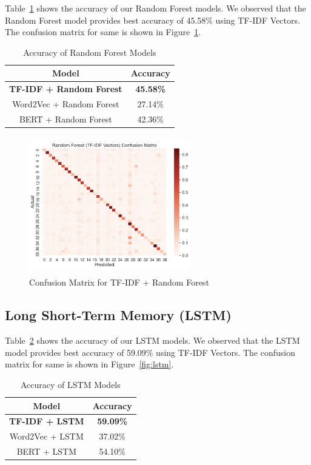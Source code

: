\documentclass[conference]{IEEEtran}
\begin{document}
Table~\ref{tab: rf_models} shows the accuracy of our Random Forest models. We observed that the Random Forest model provides best accuracy of 45.58\% using TF-IDF Vectors. The confusion matrix for same is shown in Figure~\ref{fig:rf}.

\begin{table}[!htb]
\centering
\caption{Accuracy of Random Forest Models}
\label{tab: rf_models}
\begin{tabular}{c|c}\midrule\midrule
Model & Accuracy\\ \midrule
\textbf{TF-IDF + Random Forest} & \textbf{45.58\%} \\
Word2Vec + Random Forest & 27.14\% \\
BERT + Random Forest & 42.36\% \\ \midrule\midrule
\end{tabular}
\end{table}

\begin{figure}[!htb]
\centering
\includegraphics[width=70mm, height = 60mm]{Images/Random Forest.png}
\caption{Confusion Matrix for TF-IDF + Random Forest}\label{fig:rf}
\end{figure}

\subsection{Long Short-Term Memory (LSTM)}

Table~\ref{tab: lstm_models} shows the accuracy of our LSTM models. We observed that the LSTM model provides best accuracy of 59.09\% using TF-IDF Vectors. The confusion matrix for same is shown in Figure~\ref{fig:lstm}.

\begin{table}[!htb]
\centering
\caption{Accuracy of LSTM Models}
\label{tab: lstm_models}
\begin{tabular}{c|c}\midrule\midrule
Model & Accuracy\\ \midrule
\textbf{TF-IDF + LSTM} & \textbf{59.09\%} \\
Word2Vec + LSTM & 37.02\% \\
BERT + LSTM & 54.10\% \\ \midrule\midrule
\end{tabular}
\end{table}
\end{document}
